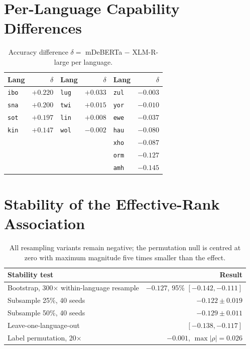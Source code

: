 \documentclass[11pt]{article}
\begin{document}
\section{Per-Language Capability Differences}
\label{app:perlang}

\begin{table}[h]
\centering
\small
\begin{tabular}{lrlrlr}
\toprule
Lang & $\delta$ & Lang & $\delta$ & Lang & $\delta$ \\
\midrule
\texttt{ibo} & $+0.220$ & \texttt{lug} & $+0.033$ & \texttt{zul} & $-0.003$ \\
\texttt{sna} & $+0.200$ & \texttt{twi} & $+0.015$ & \texttt{yor} & $-0.010$ \\
\texttt{sot} & $+0.197$ & \texttt{lin} & $+0.008$ & \texttt{ewe} & $-0.037$ \\
\texttt{kin} & $+0.147$ & \texttt{wol} & $-0.002$ & \texttt{hau} & $-0.080$ \\
             &          &              &          & \texttt{xho} & $-0.087$ \\
             &          &              &          & \texttt{orm} & $-0.127$ \\
             &          &              &          & \texttt{amh} & $-0.145$ \\
\bottomrule
\end{tabular}
\caption{Accuracy difference $\delta=$ mDeBERTa $-$ XLM-R-large per language.}
\label{tab:perlang}
\end{table}

\section{Stability of the Effective-Rank Association}
\label{app:stability}

\begin{table}[h]
\centering
\small
\begin{tabular}{lr}
\toprule
Stability test & Result \\
\midrule
Bootstrap, 300$\times$ within-language resample & $-0.127$, 95\% $[-0.142,-0.111]$ \\
Subsample 25\%, 40 seeds & $-0.122 \pm 0.019$ \\
Subsample 50\%, 40 seeds & $-0.129 \pm 0.011$ \\
Leave-one-language-out & $[-0.138, -0.117]$ \\
Label permutation, 20$\times$ & $-0.001$, $\max|\rho| = 0.026$ \\
\bottomrule
\end{tabular}
\caption{All resampling variants remain negative; the permutation null is
centred at zero with maximum magnitude five times smaller than the effect.}
\label{tab:stability}
\end{table}
\end{document}
